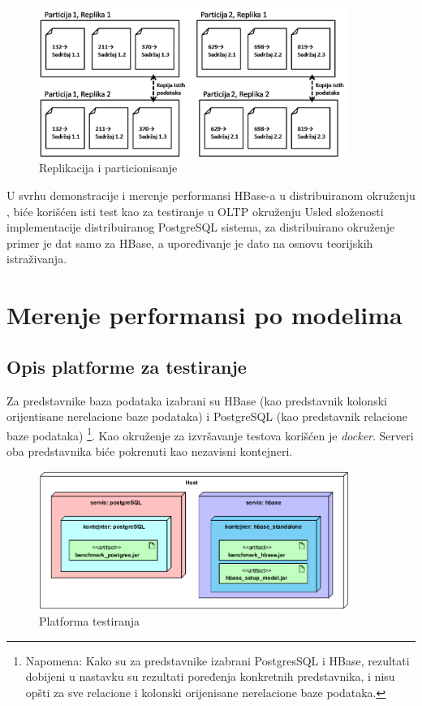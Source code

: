 \documentclass[12pt,oneside]{memoir}
\begin{document}
\begin{figure}[!ht]
  \centering
  \includegraphics[width=0.9\textwidth]{replica-partition.png}
  \caption{Replikacija i particionisanje}
  \label{fig:grafikon}
\end{figure}

U svrhu demonstracije i merenje performansi  HBase-a u distribuiranom okruženju , biće korišćen isti test kao za testiranje u OLTP okruženju {Usled složenosti implementacije distribuiranog PostgreSQL sistema, za distribuirano okruženje primer je dat samo za HBase, a upoređivanje je dato na osnovu teorijskih istraživanja}. 


\chapter{Merenje performansi po modelima}

\section{Opis platforme za testiranje}

Za predstavnike baza podataka izabrani su HBase (kao predstavnik kolonski orijentisane nerelacione baze podataka) i PostgreSQL (kao predstavnik relacione baze podataka) \footnote{Napomena: Kako su za predstavnike izabrani PostgresSQL i HBase, rezultati dobijeni u nastavku su rezultati poređenja konkretnih predstavnika, i nisu opšti za sve relacione i kolonski orijenisane nerelacione baze podataka.}.  Kao okruženje za izvršavanje testova  korišćen je \textit{docker}. Serveri oba predstavnika biće pokrenuti kao nezavisni kontejneri. 

\begin{figure}[!ht]
  \centering
  \includegraphics[width=0.9\textwidth]{deployment_diagram.png}
  \caption{Platforma testiranja}
  \label{fig:grafikon}
\end{figure}
\end{document}
